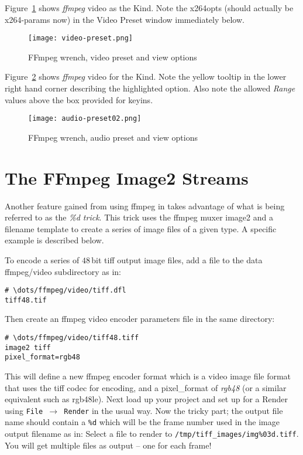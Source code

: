 Figure~\ref{fig:video-preset} shows \textit{ffmpeg} video as the Kind. Note the x264opts (should actually be x264-params now) in the Video Preset window immediately below.

\begin{figure}[htpb]
    \centering
    \texttt{[image: video-preset.png]}
    \caption{FFmpeg wrench, video preset and view options}
    \label{fig:video-preset}
\end{figure}

Figure~\ref{fig:audio-preset02} shows \textit{ffmpeg} video for the Kind. Note the yellow tooltip in the lower right hand corner describing the highlighted option.  Also note the allowed \textit{Range} values above the box provided for keyins.

\begin{figure}[htpb]
    \centering
    \texttt{[image: audio-preset02.png]}
    \caption{FFmpeg wrench, audio preset and view options}
    \label{fig:audio-preset02}
\end{figure}

\section{The FFmpeg Image2 Streams}%
\label{sec:ffmpeg_image2_streams}

Another feature gained from using ffmpeg in \CGG{} takes advantage of what is being referred to as the \textit{\%d trick}.  This trick uses the ffmpeg muxer image2 and a filename template to create a series of image files of a given type.  A specific example is described below.

To encode a series of $48$\,bit tiff output image files, add a file to the \CGG{} data ffmpeg/video subdirectory as in:

\begin{lstlisting}[style=sh]
# \dots/ffmpeg/video/tiff.dfl
tiff48.tif
\end{lstlisting}

Then create an ffmpeg video encoder parameters file in the same directory:

\begin{lstlisting}[style=sh]
# \dots/ffmpeg/video/tiff48.tiff
image2 tiff
pixel_format=rgb48
\end{lstlisting}

This will define a new ffmpeg encoder format which is a video image file format that uses the tiff codec for encoding, and a pixel\_format of \textit{rgb48} (or a similar equivalent such as rgb48le).  Next load up your project and set up for a Render using \texttt{File $\rightarrow$ Render} in the usual way.  Now the tricky part; the output file name should contain a \texttt{\%d} which will be the frame number used in the image output filename as in:  Select a file to render to  \texttt{/tmp/tiff\_images/img\%03d.tiff}.  You will get multiple files as output -- one for each frame!

